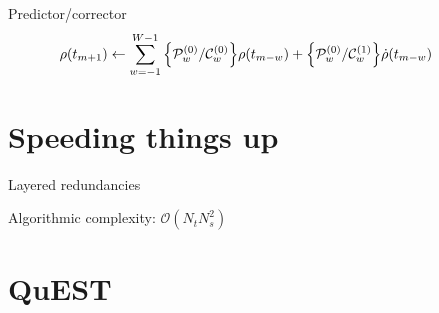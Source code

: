 \documentclass[aspectratio=169]{beamer}
\begin{document}
\begin{frame}
  \begin{block}{Predictor/corrector}
    \begin{equation*}
      \rho(t_{m + 1}) \leftarrow \sum_{w = {-1}}^{W - 1} \qty{\mathcal{P}_{w}^{(0)} / \mathcal{C}_{w}^{(0)}} \rho(t_{m-w}) + \qty{\mathcal{P}_{w}^{(0)}/ \mathcal{C}_{w}^{(1)}} \dot{\rho}(t_{m - w}) \qquad
    \end{equation*}
  \end{block}
\end{frame}


\section{Speeding things up}

\begin{frame}{Layered redundancies}
  \begin{center}
    Algorithmic complexity: $\displaystyle\mathcal{O}(N_t N_s^2)$
  \end{center}
\end{frame}

\section{QuEST}
\end{document}
